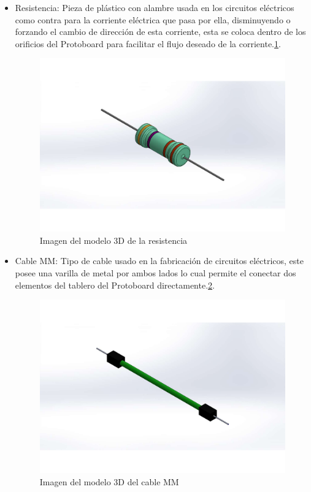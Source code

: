 \begin{itemize}
    \item Resistencia: Pieza de plástico con alambre usada en los circuitos eléctricos como contra para la corriente eléctrica que pasa por ella, disminuyendo o forzando el cambio de dirección de esta corriente, esta se coloca dentro de los orificios del Protoboard para facilitar el flujo deseado de la corriente.\ref{fig:resistencia}.
    
            \begin{figure}[H]
        \centering
        \includegraphics[trim = {65mm 40mm 80mm 60mm},clip,scale=0.5]{19/Img/resistenciaFigura.pdf}
        \caption{Imagen del modelo 3D de la resistencia}
        \label{fig:resistencia}
    \end{figure}
    
    \item Cable MM: Tipo de cable usado en la fabricación de circuitos eléctricos, este posee una varilla de metal por ambos lados lo cual permite el conectar dos elementos del tablero del Protoboard directamente.\ref{fig:cableMM}.
    
            \begin{figure}[H]
        \centering
        \includegraphics[trim = {70mm 60mm 60mm 50mm},clip,scale=0.5]{19/Img/cableMMFigura.pdf}
        \caption{Imagen del modelo 3D del cable MM}
        \label{fig:cableMM}
    \end{figure}
    

\end{itemize}
